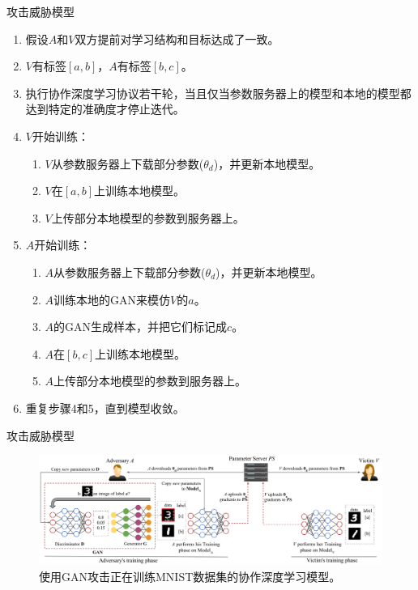 \documentclass[aspectratio=169]{beamer}
\begin{document}
\begin{frame}{攻击}{威胁模型}
\begin{enumerate}
\item 假设$A$和$V$双方提前对学习结构和目标达成了一致。
\item $V$有标签$[a,b]$，$A$有标签$[b,c]$。
\item 执行协作深度学习协议若干轮，当且仅当参数服务器上的模型和本地的模型都达到特定的准确度才停止迭代。
\item $V$开始训练：
	\begin{enumerate}
	\item $V$从参数服务器上下载部分参数($\theta_d$)，并更新本地模型。
	\item $V$在$[a,b]$上训练本地模型。
	\item $V$上传部分本地模型的参数到服务器上。
	\end{enumerate}
\item $A$开始训练：
	\begin{enumerate}
	\item $A$从参数服务器上下载部分参数($\theta_d$)，并更新本地模型。
	\item $A$训练本地的GAN来模仿$V$的$a$。
	\item $A$的GAN生成样本，并把它们标记成$c$。
	\item $A$在$[b,c]$上训练本地模型。
	\item $A$上传部分本地模型的参数到服务器上。
	\end{enumerate}
\item 重复步骤4和5，直到模型收敛。
\end{enumerate}

\end{frame}

\begin{frame}{攻击}{威胁模型}
\begin{figure}[!ht]
\includegraphics[width = \linewidth]{fig/ganscenario_new.pdf}
\caption{使用GAN攻击正在训练MNIST数据集的协作深度学习模型。}
\label{fig:ganscenario}
\end{figure}
\end{frame}
\end{document}

